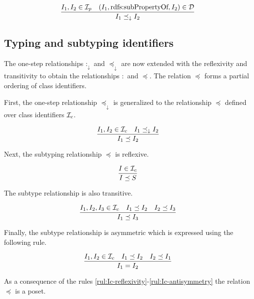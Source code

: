 \documentclass[runningheads]{llncs}
\newcommand{\darr}{\downarrow}
\newcommand{\D}{{\cal D}}
\newcommand{\Ic}{{\cal I}_c}
\newcommand{\Ip}{{\cal I}_p}
\begin{document}
\begin{equation}
\dfrac{I_1,I_2\in\Ip \quad (I_1,\text{rdfs:subPropertyOf},I_2)\in \D}
      {I_1\preceq_\darr\/I_2}
\end{equation}




\subsection{Typing and subtyping identifiers\label{section:idents-typing}}

The one-step relationships $:_\darr$ and $\preceq_\darr$ are now
extended with the reflexivity and transitivity to obtain the
relationships $:$ and $\preceq$. The relation $\preceq$ forms a
partial ordering of class
identifiers. %

First, the one-step relationship $\preceq_\darr$ is generalized to the
relationship $\preceq$ defined over class identifiers $\Ic$.

\begin{equation}
\label{rul:Ic-extended}
\dfrac{I_1,I_2\in\Ic \quad I_1\preceq_\darr I_2}
      {I_1 \preceq I_2}
\end{equation}

Next, the subtyping relationship $\preceq$ is reflexive.

\begin{equation}
\label{rul:Ic-reflexivity}
\dfrac{I\in \Ic}
      {I\preceq\/S}
\end{equation}

The subtype relationship is also transitive. 

\begin{equation}
\label{rul:Ic-transitivity}
\dfrac{I_1,I_2,I_3\in\Ic \quad I_1\preceq\/I_2 \quad I_2\preceq\/I_3}
      {I_1\preceq\/I_3}   
\end{equation}

Finally, the subtype relationship is asymmetric which is expressed
using the following rule. 

\begin{equation}
\label{rul:Ic-antisymmetry}
\dfrac{I_1,I_2\in\Ic \quad I_1\preceq\/I_2 \quad I_2\preceq\/I_1}
      {I_1=I_2}   
\end{equation}

As a consequence of the rules
\ref{rul:Ic-reflexivity}-\ref{rul:Ic-antisymmetry} the relation
$\preceq$ is a poset.
\end{document}
